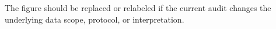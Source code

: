 The figure should be replaced or relabeled if the current audit changes the underlying data scope, protocol, or interpretation.
